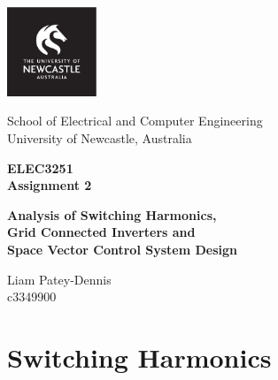 \documentclass[12pt,twoside]{scrartcl}
\begin{document}
\setcounter{page}{1}
\begin{titlepage}
    \begin{center}

        \includegraphics[width=0.2\textwidth]{LOGO_Square.pdf}

        \vspace*{0.4cm}
        School of Electrical and Computer Engineering \\
        University of Newcastle, Australia
        
        \vspace{1cm}
        \huge
        \textbf{\textsf{ELEC3251 \\ }}
        \vspace{0.2cm}
        \huge
        \textbf{\textsf{Assignment 2}}

        \vspace{0.5cm}
        \large
        \textbf{\textsf{Analysis of Switching Harmonics, \\ 
                        Grid Connected Inverters and \\ 
                        Space Vector Control System Design
                        }}

        \vspace{1.5cm}
        \normalsize
        Liam Patey-Dennis \\
        c3349900
        \vfill    
    \end{center}
\end{titlepage}


\section{Switching Harmonics}
\end{document}
